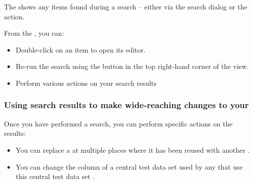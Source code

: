 The \gdsearchresultview{} shows any items found during a search -- either via the search dialog or the  action.

From the \gdsearchresultview{}, you can:

\begin{itemize}
\item Double-click on an item to open its editor. 
\item Re-run the search using the button in the top right-hand corner of the view. 
\item Perform various actions on your search results 
\end{itemize}

\subsubsection{Using search results to make wide-reaching changes to your \gdproject{}}
\label{TasksSearchResultActions}

Once you have performed a search, you can perform specific actions on the results:
\begin{itemize}
\item You can replace a \gdcase{} at multiple places where it has been reused with another \gdcase{} .
\item You can change the column of a central test data set used by any \gdcases{} that use this central test data set .
\end{itemize}

